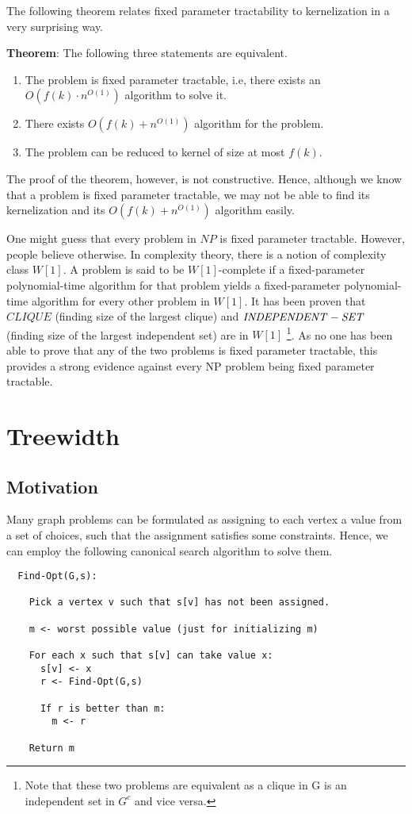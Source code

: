 \documentclass{article}
\begin{document}
The following theorem relates fixed parameter tractability to kernelization in a very surprising way.

\textbf{Theorem}:
The following three statements are equivalent.
\begin{enumerate}
\item The problem is fixed parameter tractable, i.e, there exists an $O(f(k) \cdot n^{O(1)})$ algorithm to solve it.
\item There exists $O(f(k) + n^{O(1)})$ algorithm for the problem.
\item The problem can be reduced to kernel of size at most $f(k)$.
\end{enumerate}

The proof of the theorem, however, is not constructive. Hence, although we know that a problem is fixed parameter
tractable, we may not be able to find its kernelization and its $O(f(k) + n^{O(1)})$ algorithm easily.

One might guess that every problem in $NP$ is fixed parameter tractable. However, people believe otherwise.
In complexity theory, there is a notion of complexity class $W[1]$. A problem is said to be $W[1]$-complete
if a fixed-parameter polynomial-time algorithm for that problem yields a fixed-parameter polynomial-time
algorithm for every other problem in $W[1]$. It has been proven that $CLIQUE$ (finding size of the largest clique) and $\mathrm{{\it INDEPENDENT-SET}}$ (finding size of the largest independent set) are in $W[1]$ \footnote{Note that these two problems are equivalent as a clique in G is an independent set in $G^c$ and vice versa.}. As no one has been able to prove that any of the two problems is fixed parameter tractable, this
provides a strong evidence against every NP problem being fixed parameter tractable.

\section{Treewidth}
\subsection{Motivation}
Many graph problems can be formulated as assigning to each vertex a value from a set of choices, such that
the assignment satisfies some constraints. Hence, we can employ the following canonical search algorithm
to solve them.

\begin{lstlisting}
  Find-Opt(G,s):
    
    Pick a vertex v such that s[v] has not been assigned.

    m <- worst possible value (just for initializing m)

    For each x such that s[v] can take value x:
      s[v] <- x
      r <- Find-Opt(G,s)

      If r is better than m:
        m <- r

    Return m
\end{lstlisting}
\end{document}
